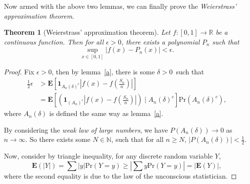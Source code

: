 \documentclass[
]{article}
\newtheorem{theorem}{Theorem}
\begin{document}
Now armed with the above two lemmas, we can finally prove the
\textit{Weierstrass' approximation 
theorem}.

\begin{theorem}[Weierstrass' approximation theorem]
Let $f : [0, 1] \to \mathbb{R}$ be a continuous function. Then for all $\epsilon > 0$, there exists a polynomial 
$P_n$ such that 
$$\sup_{x \in [0, 1]} \left| f(x) - P_n(x) \right| < \epsilon. $$
\end{theorem}

\begin{proof}
Fix $\epsilon > 0$, then by lemma~\ref{a}, there is some $\delta > 0$ such that 
\begin{align*}
 \frac{1}{2}\epsilon & > \mathbf{E}\left[ \mathbf{1}_{A_n(\delta)^c} \left| f(x) - f \left(\frac{S_n}{n}\right) \right| \right] \\
 &= \mathbf{E}\left[ \left(\mathbf{1}_{(A_n)^c} \left| f(x) - f \left(\frac{S_n}{n}\right) \right| \right) \mid A_n(\delta)^c \right] \text{Pr}(A_n(\delta)^c), 
\end{align*}
where $A_n(\delta)$ is defined the same way as lemma~\ref{a}.

By considering the \textit{weak law of large numbers}, we have $P(A_n(\delta)) \to 0$ as $n \to \infty$. So there exists 
some $N \in \mathbb{N}$, such that for all $n \ge N$, $\left| P(A_n(\delta)) \right| < \frac{1}{2}$.

Now, consider by triangle inequality, for any discrete random variable $Y$, 
$$\mathbf{E}(\left| Y \right|) = \sum \left| y \right| \text{Pr}(Y = y) \ge \left| \sum y \text{Pr}(Y = y) \right| = \left| \mathbf{E}(Y) \right|,$$
where the second equality is due to the law of the unconscious statistician.


\end{proof}
\end{document}
